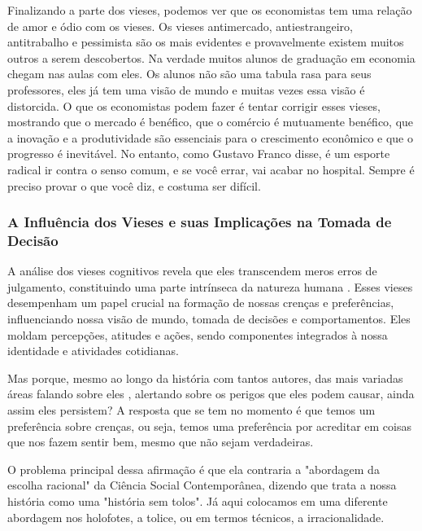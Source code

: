 Finalizando a parte dos vieses, podemos ver que os economistas tem uma relação de amor e ódio com os vieses. Os vieses antimercado, antiestrangeiro, antitrabalho e pessimista são os mais evidentes e provavelmente existem muitos outros a serem descobertos. Na verdade muitos alunos de graduação em economia chegam nas aulas com eles. Os alunos não são uma tabula rasa para seus professores, eles já tem uma visão de mundo e muitas vezes essa visão é distorcida. O que os economistas podem fazer é tentar corrigir esses vieses, mostrando que o mercado é benéfico, que o comércio é mutuamente benéfico, que a inovação e a produtividade são essenciais para o crescimento econômico e que o progresso é inevitável. No entanto, como Gustavo Franco disse, é um esporte radical ir contra o senso comum, e se você errar, vai acabar no hospital. Sempre é preciso provar o que você diz, e costuma ser difícil.

\subsubsection{A Influência dos Vieses e suas Implicações na Tomada de Decisão}

A análise dos vieses cognitivos revela que eles transcendem meros erros de julgamento, constituindo uma parte intrínseca da natureza humana \cite{kahneman2011thinking}. Esses vieses desempenham um papel crucial na formação de nossas crenças e preferências, influenciando nossa visão de mundo, tomada de decisões e comportamentos. Eles moldam percepções, atitudes e ações, sendo componentes integrados à nossa identidade e atividades cotidianas.

Mas porque, mesmo ao longo da história com tantos autores, das mais variadas áreas falando sobre eles \cite{bastiat1859sofismas,schumpeter1976capitalism,blinder1987hard,smith1776inquiry,von2022capital,sowell2000basic}, alertando sobre os perigos que eles podem causar, ainda assim eles persistem? A resposta que se tem no momento é que temos um preferência sobre crenças, ou seja, temos uma preferência por acreditar em coisas que nos fazem sentir bem, mesmo que não sejam verdadeiras. 

O problema principal dessa afirmação é que ela contraria a "abordagem da escolha racional" da Ciência Social Contemporânea, dizendo que trata a nossa história como uma "história sem tolos". Já aqui colocamos em uma diferente abordagem nos holofotes, a tolice, ou em termos técnicos, a irracionalidade.

